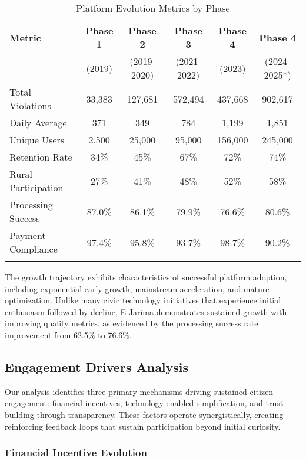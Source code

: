 \documentclass[pdflatex,sn-mathphys-num]{sn-jnl}%
\theoremstyle{thmstyleone}%
\theoremstyle{thmstyletwo}%
\theoremstyle{thmstylethree}%
\begin{document}
\begin{table}[h]
\centering
\caption{Platform Evolution Metrics by Phase}\label{tab:evolution_metrics}
\begin{tabular}{lccccc}
\toprule
\textbf{Metric} & \textbf{Phase 1} & \textbf{Phase 2} & \textbf{Phase 3} & \textbf{Phase 4} & \textbf{Phase 4} \\
 & (2019) & (2019-2020) & (2021-2022) & (2023) & (2024-2025*) \\
\midrule
Total Violations & 33,383 & 127,681 & 572,494 & 437,668 & 902,617 \\
Daily Average & 371 & 349 & 784 & 1,199 & 1,851 \\
Unique Users & 2,500 & 25,000 & 95,000 & 156,000 & 245,000 \\
Retention Rate & 34\% & 45\% & 67\% & 72\% & 74\% \\
Rural Participation & 27\% & 41\% & 48\% & 52\% & 58\% \\
Processing Success & 87.0\% & 86.1\% & 79.9\% & 76.6\% & 80.6\% \\
Payment Compliance & 97.4\% & 95.8\% & 93.7\% & 98.7\% & 90.2\% \\
\botrule
\end{tabular}
\end{table}

The growth trajectory exhibits characteristics of successful platform adoption, including exponential early growth, mainstream acceleration, and mature optimization. Unlike many civic technology initiatives that experience initial enthusiasm followed by decline, E-Jarima demonstrates sustained growth with improving quality metrics, as evidenced by the processing success rate improvement from 62.5\% to 76.6\%.

\subsection{Engagement Drivers Analysis}\label{subsec13}

Our analysis identifies three primary mechanisms driving sustained citizen engagement: financial incentives, technology-enabled simplification, and trust-building through transparency. These factors operate synergistically, creating reinforcing feedback loops that sustain participation beyond initial curiosity.

\subsubsection{Financial Incentive Evolution}
\end{document}
